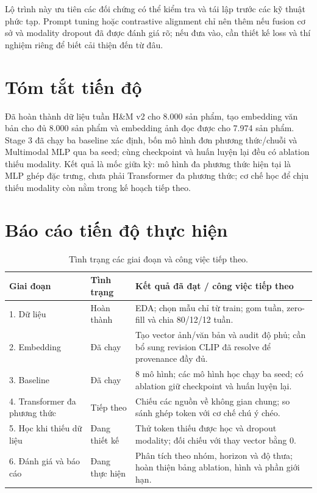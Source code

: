 \documentclass[12pt,a4paper,oneside]{article}
\begin{document}
Lộ trình này ưu tiên các đối chứng có thể kiểm tra và tái lập trước các kỹ thuật phức tạp. Prompt tuning hoặc contrastive alignment chỉ nên thêm nếu fusion cơ sở và modality dropout đã được đánh giá rõ; nếu đưa vào, cần thiết kế loss và thí nghiệm riêng để biết cải thiện đến từ đâu.

\clearpage
\clearpage
\section*{Tóm tắt tiến độ}
Đã hoàn thành dữ liệu tuần H\&M v2 cho 8.000 sản phẩm, tạo embedding văn bản cho đủ 8.000 sản phẩm và embedding ảnh đọc được cho 7.974 sản phẩm. Stage 3 đã chạy ba baseline xác định, bốn mô hình đơn phương thức/chuỗi và Multimodal MLP qua ba seed; cùng checkpoint và huấn luyện lại đều có ablation thiếu modality. Kết quả là mốc giữa kỳ: mô hình đa phương thức hiện tại là MLP ghép đặc trưng, chưa phải Transformer đa phương thức; cơ chế học để chịu thiếu modality còn nằm trong kế hoạch tiếp theo.
\vspace{0.5cm}

\section*{Báo cáo tiến độ thực hiện}
\begin{table}[!htbp]
\centering
\caption{Tình trạng các giai đoạn và công việc tiếp theo.}
\label{tab:progress}
\begin{tabularx}{\textwidth}{p{}p{}X}
\toprule
Giai đoạn & Tình trạng & Kết quả đã đạt / công việc tiếp theo \\
\midrule
1. Dữ liệu & Hoàn thành & EDA; chọn mẫu chỉ từ train; gom tuần, zero-fill và chia 80/12/12 tuần. \\
2. Embedding & Đã chạy & Tạo vector ảnh/văn bản và audit độ phủ; cần bổ sung revision CLIP đã resolve để provenance đầy đủ. \\
3. Baseline & Đã chạy & 8 mô hình; các mô hình học chạy ba seed; có ablation giữ checkpoint và huấn luyện lại. \\
4. Transformer đa phương thức & Tiếp theo & Chiếu các nguồn về không gian chung; so sánh ghép token với cơ chế chú ý chéo. \\
5. Học khi thiếu dữ liệu & Đang thiết kế & Thử token thiếu được học và dropout modality; đối chiếu với thay vector bằng 0. \\
6. Đánh giá và báo cáo & Đang thực hiện & Phân tích theo nhóm, horizon và độ thưa; hoàn thiện bảng ablation, hình và phần giới hạn. \\
\bottomrule
\end{tabularx}
\end{table}
\end{document}
